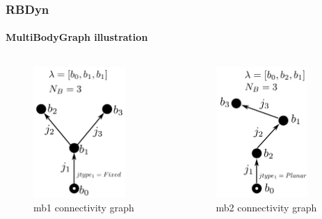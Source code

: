 \documentclass{beamer}
\begin{document}
	\begin{frame}
	\frametitle{RBDyn}
	\framesubtitle{MultiBodyGraph illustration}
	\begin{columns}[T]
		\begin{column}[T]{5cm}
			\begin{figure}
				\includegraphics[height=5cm]{img/robot2_graph.pdf}
				\caption{mb1 connectivity graph}
			\end{figure}
		\end{column}
		\begin{column}[T]{5cm}
			\begin{figure}
				\includegraphics[height=5cm]{img/robot3_graph.pdf}
				\caption{mb2 connectivity graph}
			\end{figure}
		\end{column}
		 \end{columns}
\end{frame}
\end{document}
